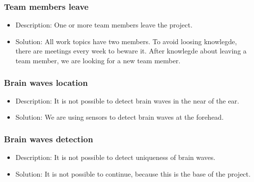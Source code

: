 \subsubsection*{Team members leave}
\begin{itemize}
 \item Description: One or more team members leave the project.
 \item Solution: All work topics have two members. To avoid loosing knowlegde, there are meetings every week to beware it. After knowlegde about leaving a team member, we are looking for a new team member.
\end{itemize}

\subsubsection*{Brain waves location}
\begin{itemize}
 \item  Description: It is not possible to detect brain waves in the near of the ear.
 \item Solution: We are using sensors to detect brain waves at the forehead.
\end{itemize}

\subsubsection*{Brain waves detection}
\begin{itemize}
 \item Description: It is not possible to detect uniqueness of brain waves.
 \item Solution: It is not possible to continue, because this is the base of the project.
\end{itemize}

